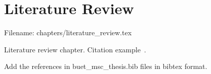 \chapter{Literature Review} \label{ch:literature_review}
Filename: chapters/literature\_review.tex

Literature review chapter. Citation example~\cite{Rida_19}.

Add the references in buet\_msc\_thesis.bib files in bibtex format.

 


